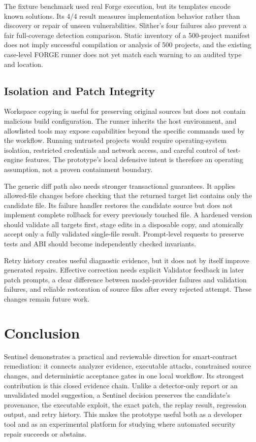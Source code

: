 \documentclass[conference,a4paper,10pt]{IEEEtran}
\begin{document}
The fixture benchmark used real Forge execution, but its templates encode known solutions. Its 4/4 result measures implementation behavior rather than discovery or repair of unseen vulnerabilities. Slither's four failures also prevent a fair full-coverage detection comparison. Static inventory of a 500-project manifest does not imply successful compilation or analysis of 500 projects, and the existing case-level FORGE runner does not yet match each warning to an audited type and location.

\subsection{Isolation and Patch Integrity}
Workspace copying is useful for preserving original sources but does not contain malicious build configuration. The runner inherits the host environment, and allowlisted tools may expose capabilities beyond the specific commands used by the workflow. Running untrusted projects would require operating-system isolation, restricted credentials and network access, and careful control of test-engine features. The prototype's local defensive intent is therefore an operating assumption, not a proven containment boundary.

The generic diff path also needs stronger transactional guarantees. It applies allowed-file changes before checking that the returned target list contains only the candidate file. Its failure handler restores the candidate source but does not implement complete rollback for every previously touched file. A hardened version should validate all targets first, stage edits in a disposable copy, and atomically accept only a fully validated single-file result. Prompt-level requests to preserve tests and ABI should become independently checked invariants.

Retry history creates useful diagnostic evidence, but it does not by itself improve generated repairs. Effective correction needs explicit Validator feedback in later patch prompts, a clear difference between model-provider failures and validation failures, and reliable restoration of source files after every rejected attempt. These changes remain future work.

\section{Conclusion}
Sentinel demonstrates a practical and reviewable direction for smart-contract remediation: it connects analyzer evidence, executable attacks, constrained source changes, and deterministic acceptance gates in one local workflow. Its strongest contribution is this closed evidence chain. Unlike a detector-only report or an unvalidated model suggestion, a Sentinel decision preserves the candidate's provenance, the executable exploit, the exact patch, the replay result, regression output, and retry history. This makes the prototype useful both as a developer tool and as an experimental platform for studying where automated security repair succeeds or abstains.
\end{document}
